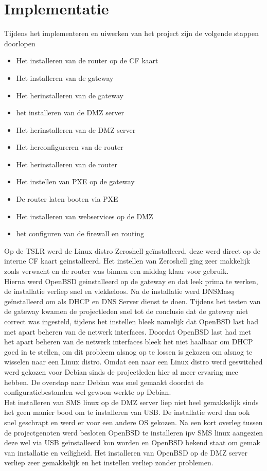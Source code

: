 \documentclass[12pt]{article}
\begin{document}
\section{Implementatie}
Tijdens het implementeren en uiwerken van het project zijn de volgende stappen doorlopen
\begin{itemize}
\item Het installeren van de router op de CF kaart
\item Het installeren van de gateway
\item Het herinstalleren van de gateway
\item het installeren van de DMZ server
\item Het herinstalleren van de DMZ server
\item Het herconfigureren van de router
\item Het herinstalleren van de router
\item Het instellen van PXE op de gateway
\item De router laten booten via PXE
\item Het installeren van webservices op de DMZ
\item het configuren van de firewall en routing
\end{itemize}
Op de TSLR werd de Linux distro Zeroshell ge\"installeerd, deze werd direct op de interne CF kaart geinstalleerd. Het instellen van Zeroshell ging zeer makkelijk zoals verwacht en de router was binnen een middag klaar voor gebruik.
\\Hierna werd OpenBSD geinstalleerd op de gateway en dat leek prima te werken, de installatie verliep snel en vlekkeloos. Na de installatie werd DNSMasq ge\"installeerd om als DHCP en DNS Server dienst te doen. 
Tijdens het testen van de gateway kwamen de projectleden snel tot de conclusie dat de gateway niet correct was ingesteld, tijdens het instellen bleek namelijk dat OpenBSD last had met apart beheren van de netwerk interfaces. Doordat OpenBSD last had met het apart beheren van de netwerk interfaces bleek het niet haalbaar om DHCP goed in te stellen, om dit probleem alsnog op te lossen is gekozen om alsnog te wisselen naar een Linux distro. Omdat een naar een Linux distro werd geswitched werd gekozen voor Debian sinds de projectleden hier al meer ervaring mee hebben. De overstap naar Debian was snel gemaakt doordat de configuratiebestanden wel gewoon werkte op Debian.
\\Het installeren van SMS linux op de DMZ server liep niet heel gemakkelijk sinds het geen manier bood om te installeren van USB. De installatie werd dan ook snel geschrapt en werd er voor een andere OS gekozen. Na een kort overleg tussen de projectgenoten werd besloten OpenBSD te installeren ipv SMS linux aangezien deze wel via USB ge\"installeerd kon worden en OpenBSD bekend staat om gemak van installatie en veiligheid. Het installeren van OpenBSD op de DMZ server verliep zeer gemakkelijk en het instellen verliep zonder problemen.
\end{document}
